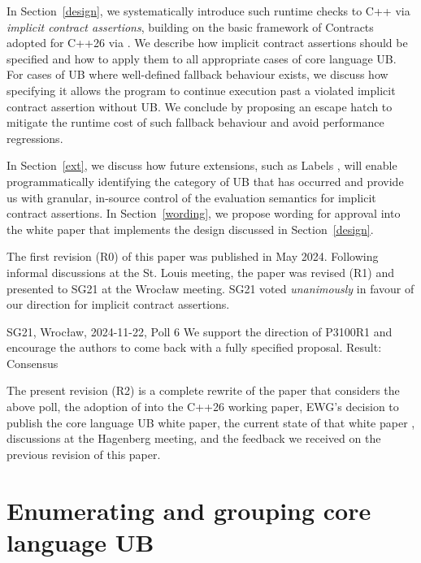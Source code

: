 In Section~\ref{design}, we systematically introduce such runtime checks to C++ via  \emph{implicit contract assertions}, building on the basic framework of Contracts adopted for C++26 via \cite{P2900R14}. We describe how implicit contract assertions should be specified and how to apply them to all appropriate cases of core language UB. For cases of UB where well-defined fallback behaviour exists, we discuss how specifying it allows the program to continue execution past a violated implicit contract assertion without UB. We conclude by proposing an escape hatch to mitigate the runtime cost of such fallback behaviour and avoid performance regressions.

In Section~\ref{ext}, we discuss how future extensions, such as Labels \cite{P3400R1},
will enable programmatically identifying the category of UB that has occurred and provide us with granular, in-source control of the evaluation semantics for implicit contract assertions. In Section~\ref{wording}, we propose wording for approval into the white paper that implements the design discussed in Section~\ref{design}.

The first revision (R0) of this paper was published in May 2024. Following informal discussions at the St. Louis meeting, the paper was revised (R1) and presented to SG21 at the Wroc{\l}aw meeting. SG21 voted \emph{unanimously} in favour of our direction for implicit contract assertions.
\vspace{2mm}
\begin{wgpoll}{{SG21, Wroc{\l}aw, 2024-11-22, Poll 6}}
We support the direction of P3100R1 and encourage the authors to come back with a fully specified proposal.
Result: Consensus
\end{wgpoll}
\vspace{2mm}

The present revision (R2) is a complete rewrite of the paper that considers the above poll, the adoption of \cite{P2900R14} into the C++26 working paper, EWG's decision to publish the core language UB white paper, the current state of that white paper \cite{P3656R1}, discussions at the Hagenberg meeting, and the feedback we received on the previous revision of this paper.

\section{Enumerating and grouping core language UB}
\label{ub}



